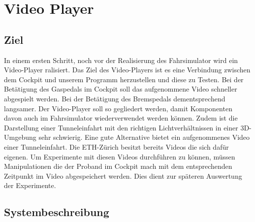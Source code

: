 \section{Video Player}
\subsection{Ziel}
In einem ersten Schritt, noch vor der Realisierung des Fahrsimulator wird ein Video-Player ralisiert. Das Ziel des Video-Players ist es eine Verbindung zwischen dem Cockpit und unserem Programm herzustellen und diese zu Testen. Bei der Betätigung des Gaspedals im Cockpit soll das aufgenommene Video schneller abgespielt werden. Bei der Betätigung des Bremspedals dementsprechend langsamer. Der Video-Player soll so gegliedert werden, damit Komponenten davon auch im Fahrsimulator wiederverwendet werden können. Zudem ist die Darstellung einer Tunneleinfahrt mit den richtigen Lichtverhältnissen in einer 3D-Umgebung sehr schwierig. Eine gute Alternative bietet ein aufgenommenes Video einer Tunneleinfahrt. Die ETH-Zürich besitzt bereits Videos die sich dafür eigenen. Um Experimente mit diesen Videos durchführen zu können, müssen Manipulationen die der Proband im Cockpit mach mit dem entsprechenden Zeitpunkt im Video abgespeichert werden. Dies dient zur späteren Auswertung der Experimente. 

\subsection{Systembeschreibung}

